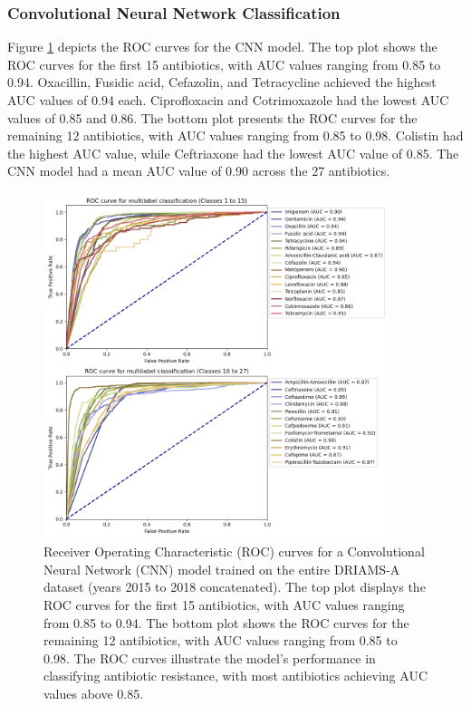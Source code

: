 \documentclass[english,11pt,a4paper,titlepage]{article}
\begin{document}
\subsubsection*{Convolutional Neural Network Classification}
Figure \ref{fig:ROC_cnn} depicts the ROC curves for the CNN model. The top plot shows the ROC curves for the first 15 antibiotics, with AUC values ranging from 0.85 to 0.94. Oxacillin, Fusidic acid, Cefazolin, and Tetracycline achieved the highest AUC values of 0.94 each. Ciprofloxacin and Cotrimoxazole had the lowest AUC values of 0.85 and 0.86. The bottom plot presents the ROC curves for the remaining 12 antibiotics, with AUC values ranging from 0.85 to 0.98. Colistin had the highest AUC value, while Ceftriaxone had the lowest AUC value of 0.85. The CNN model had a mean AUC value of 0.90 across the 27 antibiotics.

\begin{figure}[h!]
	\centering
	\includegraphics[width=0.9\textwidth]{img/FBeta_SiLU_ROC_curve.png}
	\caption{Receiver Operating Characteristic (ROC) curves for a Convolutional Neural Network (CNN) model trained on the entire DRIAMS-A dataset (years 2015 to 2018 concatenated). The top plot displays the ROC curves for the first 15 antibiotics, with AUC values ranging from 0.85 to 0.94. The bottom plot shows the ROC curves for the remaining 12 antibiotics, with AUC values ranging from 0.85 to 0.98. The ROC curves illustrate the model's performance in classifying antibiotic resistance, with most antibiotics achieving AUC values above 0.85.}
	\label{fig:ROC_cnn}
\end{figure}
\end{document}
